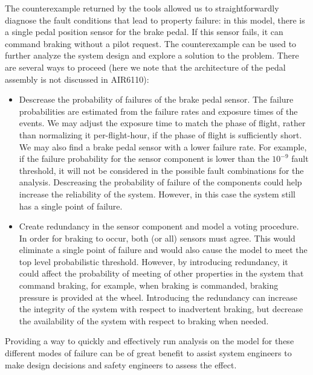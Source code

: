 The counterexample returned by the tools allowed us to straightforwardly diagnose the fault conditions that lead to property failure: in this model, there is a single pedal position sensor for the brake pedal. If this sensor fails, it can command braking without a pilot request. The counterexample can be used to further analyze the system design and explore a solution to the problem. There are several ways to proceed (here we note that the architecture of the pedal assembly is not discussed in AIR6110):
	\begin{itemize}
	\renewcommand{\labelitemi}{\textbullet}
	\item Descrease the probability of failures of the brake pedal sensor. The failure probabilities are estimated from the failure rates and exposure times of the events. We may adjust the exposure time to match the phase of flight, rather than normalizing it per-flight-hour, if the phase of flight is sufficiently short. We may also find a brake pedal sensor with a lower failure rate. For example, if the failure probability for the sensor component is lower than the $10^{-9}$ fault threshold, it will not be considered in the possible fault combinations for the analysis. Descreasing the probability of failure of the components could help increase the reliability of the system. However, in this case the system still has a single point of failure.
	
	\item Create redundancy in the sensor component and model a voting procedure.
	In order for braking to occur, both (or all) sensors must agree. This would eliminate a single point of failure and would also cause the model to meet the top level probabilistic threshold. However, by introducing redundancy, it could affect the probability of meeting of other properties in the system that command braking, for example, when braking is commanded, braking pressure is provided at the wheel. Introducing the redundancy can increase the integrity of the system with respect to inadvertent braking, but decrease the availability of the system with respect to braking when needed.
\end{itemize}

Providing a way to quickly and effectively run analysis on the model %
for these different modes of failure can be of great benefit to assist system engineers to make design decisions and safety engineers to assess the effect.

